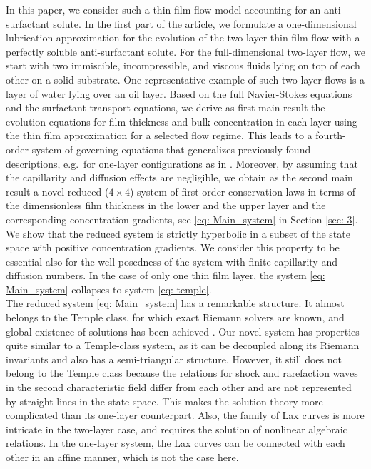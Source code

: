 \documentclass[11pt]{article}
\numberwithin{equation}{section}
\newtheorem{counter example}[theorem]{Counter Example}
\begin{document}
{In this paper, we consider such a thin film flow model accounting for an anti-surfactant solute. In the first part of the article, we formulate a one-dimensional lubrication approximation for the evolution of the two-layer thin film flow with a perfectly soluble anti-surfactant solute. For the full-dimensional two-layer flow, we start with two immiscible, incompressible, and viscous fluids lying on top of each other on a solid substrate. One representative example of such two-layer flows is a layer of water lying over an oil layer. Based on the full Navier-Stokes equations and the surfactant transport equations, we derive as first main result the evolution equations for film thickness and bulk concentration in each layer using the thin film approximation for a selected flow regime. This leads to a fourth-order system of governing equations that generalizes  previously found descriptions, e.g.~for one-layer configurations as in \cite{conn2016fluid}.
Moreover, by assuming that the capillarity and diffusion effects are negligible, we obtain as the second main result a novel reduced ($4\times 4$)-system of first-order conservation laws in terms of the dimensionless film thickness in the lower and the upper layer and the corresponding concentration gradients, see \eqref{eq: Main_system} in Section \ref{sec: 3}. We show that the reduced system is strictly hyperbolic in a subset of the state space with positive concentration gradients. We consider this property to be essential also for the well-posedness of the system with finite capillarity and diffusion numbers.  In the case of only one thin film layer, the system \eqref{eq: Main_system} collapses to system \eqref{eq: temple}.\\ 
The reduced system \eqref{eq: Main_system} has a remarkable structure. It almost belongs to the Temple class, for which exact Riemann solvers are known, and global existence of solutions has been achieved \cite{bressan2000convergence, MR892021}. 
Our novel system has properties quite similar to a Temple-class system, as it can be decoupled along its Riemann invariants and also has a semi-triangular structure. However, it still does not belong to the Temple class because the relations for shock and rarefaction waves in the second characteristic field differ from each other and are not represented by straight lines in the state space. This makes the solution theory more complicated than its one-layer counterpart.  Also, the family of Lax curves is more intricate in the two-layer case,  and requires the solution of nonlinear algebraic relations. In the one-layer system, the Lax curves can be connected with each other in an affine manner, which is not the case here.

}
\end{document}
